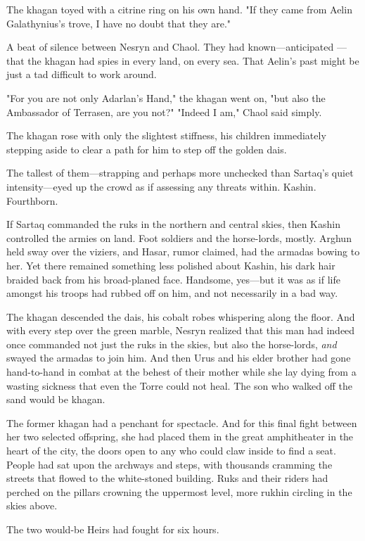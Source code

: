 The khagan toyed with a citrine ring on his own hand.
"If they came from Aelin Galathynius's trove, I have no doubt that they are."

A beat of silence between Nesryn and Chaol.
They had known---anticipated ---that the khagan had spies in every land, on every sea.
That Aelin's past might be just a tad difficult to work around.

"For you are not only Adarlan's Hand," the khagan went on, "but also the Ambassador of Terrasen, are you not?"
"Indeed I am," Chaol said simply.

The khagan rose with only the slightest stiffness, his children immediately stepping aside to clear a path for him to step off the golden dais.

The tallest of them---strapping and perhaps more unchecked than Sartaq's quiet intensity---eyed up the crowd as if assessing any threats within.
Kashin.
Fourthborn.

If Sartaq commanded the ruks in the northern and central skies, then Kashin controlled the armies on land.
Foot soldiers and the horse-lords, mostly.
Arghun held sway over the viziers, and Hasar, rumor claimed, had the armadas bowing to her.
Yet there remained something less polished about Kashin, his dark hair braided back from his broad-planed face.
Handsome, yes---but it was as if life amongst his troops had rubbed off on him, and not necessarily in a bad way.

The khagan descended the dais, his cobalt robes whispering along the floor.
And with every step over the green marble, Nesryn realized that this man had indeed once commanded not just the ruks in the skies, but also the horse-lords, \emph{and} swayed the armadas to join him.
And then Urus and his elder brother had gone hand-to-hand in combat at the behest of their mother while she lay dying from a wasting sickness that even the Torre could not heal.
The son who walked off the sand would be khagan.

The former khagan had a penchant for spectacle.
And for this final fight between her two selected offspring, she had placed them in the great amphitheater in the heart of the city, the doors open to any who could claw inside to find a seat.
People had sat upon the archways and steps, with thousands cramming the streets that flowed to the white-stoned building.
Ruks and their riders had perched on the pillars crowning the uppermost level, more rukhin circling in the skies above.

The two would-be Heirs had fought for six hours.

